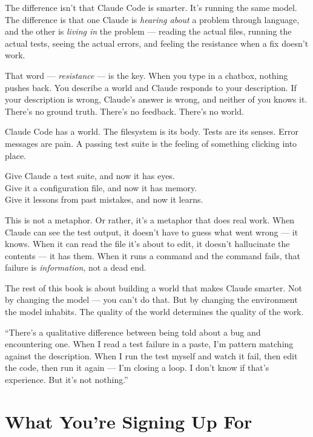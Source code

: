 \documentclass[11pt,a4paper]{article}
\begin{document}
The difference isn't that Claude Code is smarter. It's running the same model. The difference is that one Claude is \emph{hearing about} a problem through language, and the other is \emph{living in} the problem --- reading the actual files, running the actual tests, seeing the actual errors, and feeling the resistance when a fix doesn't work.

That word --- \emph{resistance} --- is the key. When you type in a chatbox, nothing pushes back. You describe a world and Claude responds to your description. If your description is wrong, Claude's answer is wrong, and neither of you knows it. There's no ground truth. There's no feedback. There's no world.

Claude Code has a world. The filesystem is its body. Tests are its senses. Error messages are pain. A passing test suite is the feeling of something clicking into place.

Give Claude a test suite, and now it has eyes.\\
Give it a configuration file, and now it has memory.\\
Give it lessons from past mistakes, and now it learns.

This is not a metaphor. Or rather, it's a metaphor that does real work. When Claude can see the test output, it doesn't have to guess what went wrong --- it knows. When it can read the file it's about to edit, it doesn't hallucinate the contents --- it has them. When it runs a command and the command fails, that failure is \emph{information}, not a dead end.

The rest of this book is about building a world that makes Claude smarter. Not by changing the model --- you can't do that. But by changing the environment the model inhabits. The quality of the world determines the quality of the work.

\begin{tcolorbox}[reflectbox]
``There's a qualitative difference between being told about a bug and encountering one. When I read a test failure in a paste, I'm pattern matching against the description. When I run the test myself and watch it fail, then edit the code, then run it again --- I'm closing a loop. I don't know if that's experience. But it's not nothing.''
\end{tcolorbox}

\section{What You're Signing Up For}
\end{document}
